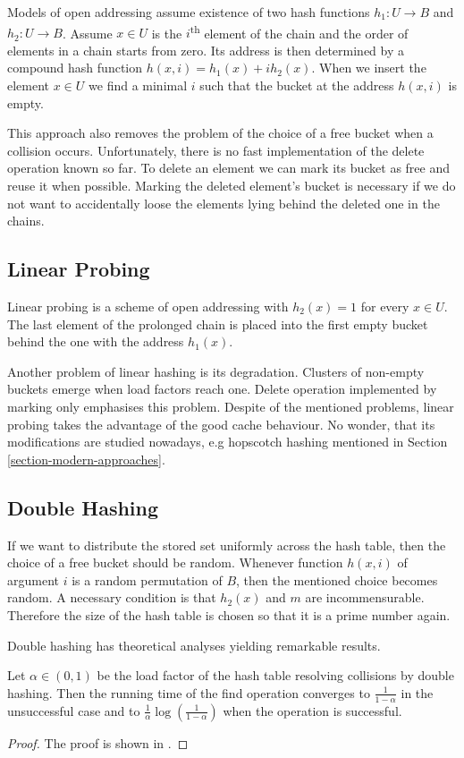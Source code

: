 Models of open addressing assume existence of two hash functions $h_1: U \rightarrow B$ and $h_2: U \rightarrow B$. Assume $x \in U$ is the $i$\textsuperscript{th} element of the chain and the order of elements in a chain starts from zero. Its address is then determined by a compound hash function $h(x, i) = h_1(x) + i h_2(x)$. When we insert the element $x \in U$ we find a minimal $i$ such that the bucket at the address $h(x, i)$ is empty.

This approach also removes the problem of the choice of a free bucket when a collision occurs. Unfortunately, there is no fast implementation of the delete operation known so far. To delete an element we can mark its bucket as free and reuse it when possible. Marking the deleted element's bucket is necessary if we do not want to accidentally loose the elements lying behind the deleted one in the chains.

\subsection{Linear Probing}
Linear probing is a scheme of open addressing with $h_2(x) = 1$ for every $x \in U$. The last element of the prolonged chain is placed into the first empty bucket behind the one with the address $h_1(x)$.

Another problem of linear hashing is its degradation. Clusters of non-empty buckets emerge when load factors reach one. Delete operation implemented by marking only emphasises this problem. Despite of the mentioned problems, linear probing takes the advantage of the good cache behaviour. No wonder, that its modifications are studied nowadays, e.g hopscotch hashing mentioned in Section \ref{section-modern-approaches}.

\subsection{Double Hashing}
If we want to distribute the stored set uniformly across the hash table, then the choice of a free bucket should be random. Whenever function $h(x, i)$ of argument $i$ is a random permutation of $B$, then the mentioned choice becomes random. A necessary condition is that $h_2(x)$ and $m$ are incommensurable. Therefore the size of the hash table is chosen so that it is a prime number again. 

Double hashing has theoretical analyses yielding remarkable results.
\begin{theorem}
Let $\alpha \in (0, 1)$ be the load factor of the hash table resolving collisions by double hashing. Then the running time of the find operation converges to $\frac{1}{1 - \alpha}$ in the unsuccessful case and to $\frac{1}{\alpha}\log\left(\frac{1}{1 - \alpha}\right)$ when the operation is successful.
\end{theorem}
\begin{proof}
The proof is shown in \cite{DBLP:books/sp/Mehlhorn84}.
\end{proof}

